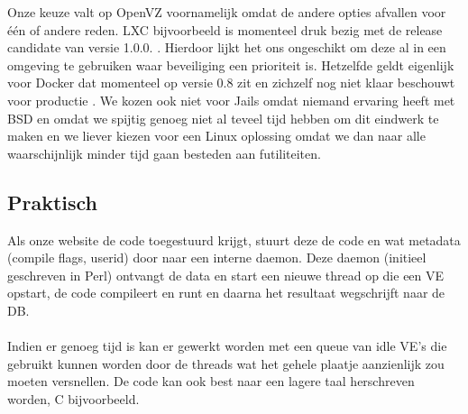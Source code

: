 Onze keuze valt op OpenVZ voornamelijk omdat de andere opties afvallen voor \'e\'en of andere reden. LXC bijvoorbeeld is momenteel druk bezig met de release candidate van versie 1.0.0. \cite{lxcbuilds}. Hierdoor lijkt het ons ongeschikt om deze al in een omgeving te gebruiken waar beveiliging een prioriteit is. Hetzelfde geldt eigenlijk voor Docker dat momenteel op versie 0.8 zit \cite{dockerpunt8} en zichzelf nog niet klaar beschouwt voor productie \cite{dockerv1}. We kozen ook niet voor Jails omdat niemand ervaring heeft met BSD en omdat we spijtig genoeg niet al teveel tijd hebben om dit eindwerk te maken en we liever kiezen voor een Linux oplossing omdat we dan naar alle waarschijnlijk minder tijd gaan besteden aan futiliteiten.\\ 

\subsection{Praktisch}
Als onze website de code toegestuurd krijgt, stuurt deze de code en wat metadata (compile flags, userid) door naar een interne daemon. Deze daemon (initieel geschreven in Perl) ontvangt de data en start een nieuwe thread op die een VE opstart, de code compileert en runt en daarna het resultaat wegschrijft naar de DB.\\
\\
Indien er genoeg tijd is kan er gewerkt worden met een queue van idle VE's die gebruikt kunnen worden door de threads wat het gehele plaatje aanzienlijk zou moeten versnellen. De code kan ook best naar een lagere taal herschreven worden, C bijvoorbeeld. 
